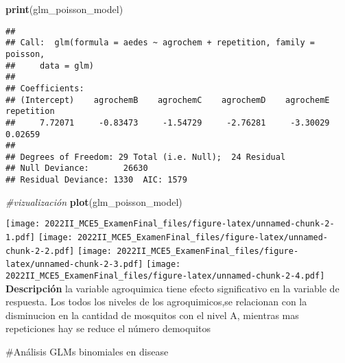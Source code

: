 \documentclass[
]{article}
\newenvironment{Shaded}{\begin{snugshade}}{\end{snugshade}}
\newcommand{\AttributeTok}[1]{\textcolor[rgb]{0.13,0.29,0.53}{#1}}
\newcommand{\CommentTok}[1]{\textcolor[rgb]{0.56,0.35,0.01}{\textit{#1}}}
\newcommand{\FunctionTok}[1]{\textcolor[rgb]{0.13,0.29,0.53}{\textbf{#1}}}
\newcommand{\NormalTok}[1]{#1}
\newcommand{\OtherTok}[1]{\textcolor[rgb]{0.56,0.35,0.01}{#1}}
\newcommand{\SpecialCharTok}[1]{\textcolor[rgb]{0.81,0.36,0.00}{\textbf{#1}}}
\newcommand{\StringTok}[1]{\textcolor[rgb]{0.31,0.60,0.02}{#1}}
\begin{document}
\begin{Shaded}
\begin{Highlighting}[]
\FunctionTok{print}\NormalTok{(glm\_poisson\_model)}
\end{Highlighting}
\end{Shaded}

\begin{verbatim}
## 
## Call:  glm(formula = aedes ~ agrochem + repetition, family = poisson, 
##     data = glm)
## 
## Coefficients:
## (Intercept)    agrochemB    agrochemC    agrochemD    agrochemE   repetition  
##     7.72071     -0.83473     -1.54729     -2.76281     -3.30029      0.02659  
## 
## Degrees of Freedom: 29 Total (i.e. Null);  24 Residual
## Null Deviance:       26630 
## Residual Deviance: 1330  AIC: 1579
\end{verbatim}

\begin{Shaded}
\begin{Highlighting}[]
\CommentTok{\#vizualización }
\FunctionTok{plot}\NormalTok{(glm\_poisson\_model)}
\end{Highlighting}
\end{Shaded}

\texttt{[image: 2022II\_MCE5\_ExamenFinal\_files/figure-latex/unnamed-chunk-2-1.pdf]}
\texttt{[image: 2022II\_MCE5\_ExamenFinal\_files/figure-latex/unnamed-chunk-2-2.pdf]}
\texttt{[image: 2022II\_MCE5\_ExamenFinal\_files/figure-latex/unnamed-chunk-2-3.pdf]}
\texttt{[image: 2022II\_MCE5\_ExamenFinal\_files/figure-latex/unnamed-chunk-2-4.pdf]}
\textbf{Descripción} la variable agroquimica tiene efecto significativo
en la variable de respuesta. Los todos los niveles de los
agroquimicos,se relacionan con la disminucion en la cantidad de
mosquitos con el nivel A, mientras mas repeticiones hay se reduce el
número demoquitos

\#Análisis GLMs binomiales en disease

\begin{Shaded}
\end{Shaded}
\end{document}
